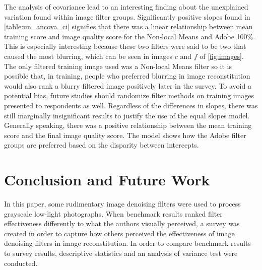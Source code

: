 \documentclass{ncjms}
\begin{document}
The analysis of covariance lead to an interesting finding about the unexplained variation found within image filter groups. Significantly positive slopes found in \autoref{table:un_ancova_ci} signifies that there was a linear relationship between mean training score and image quality score for the Non-local Means and Adobe 100\%. This is especially interesting because these two filters were said to be two that caused the most blurring, which can be seen in images $c$ and $f$ of \autoref{fig:images}. The only filtered training image used was a Non-local Means filter so it is possible that, in training, people who preferred blurring in image reconstitution would also rank a blurry filtered image positively later in the survey. To avoid a potential bias, future studies should randomize filter methods on training images presented to respondents as well. Regardless of the differences in slopes, there was still marginally insignificant results to justify the use of the equal slopes model. Generally speaking, there was a positive relationship between the mean training score and the final image quality score. The model shows how the Adobe filter groups are preferred based on the disparity between intercepts.

\section{Conclusion and Future Work}
In this paper, some rudimentary image denoising filters were used to process grayscale low-light photographs. When benchmark results ranked filter effectiveness differently to what the authors visually perceived, a survey was created in order to capture how others perceived the effectiveness of image denoising filters in image reconstitution. In order to compare benchmark results to survey results, descriptive statistics and an analysis of variance test were conducted. 
\end{document}
